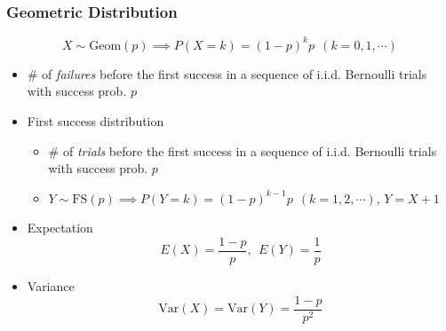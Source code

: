 \subsubsection*{Geometric Distribution}
\begin{equation}
    X\sim\text{Geom}(p)\implies P(X=k)=(1-p)^kp~~(k=0,1,\cdots)
\end{equation}
\begin{itemize}
    \item \# of \textit{failures} before the first success in a sequence of i.i.d. Bernoulli trials with success prob. $p$
    \item First success distribution
    \begin{itemize}
        \item \# of \textit{trials} before the first success in a sequence of i.i.d. Bernoulli trials with success prob. $p$
        \item $Y\sim\text{FS}(p)\implies P(Y=k)=(1-p)^{k-1}p~~(k=1,2,\cdots)$, $Y=X+1$
    \end{itemize}
    \item Expectation
    \begin{equation}
        E(X)=\frac{1-p}{p},~~E(Y)=\frac{1}{p}
    \end{equation}
    \item Variance
    \begin{equation}
        \text{Var}(X)=\text{Var}(Y)=\frac{1-p}{p^2}
    \end{equation}
\end{itemize}

